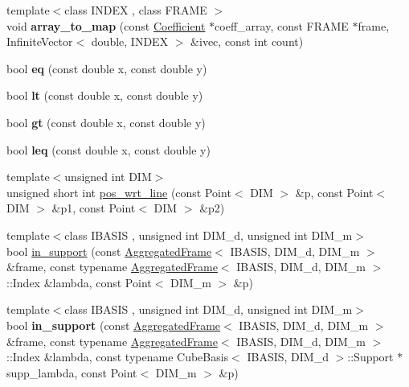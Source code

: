 \begin{CompactItemize}
\item 
\hypertarget{namespaceFrameTL_3b946e677f70c5b04b3cec8feeadc20e}{
{\footnotesize template$<$class INDEX , class FRAME $>$ }\\void \textbf{array\_\-to\_\-map} (const \hyperlink{structFrameTL_1_1Coefficient}{Coefficient} $\ast$coeff\_\-array, const FRAME $\ast$frame, InfiniteVector$<$ double, INDEX $>$ \&ivec, const int count)}
\label{namespaceFrameTL_3b946e677f70c5b04b3cec8feeadc20e}

\item 
\hypertarget{namespaceFrameTL_26ebfba3c24541d4c0b1e7591fbb6d47}{
bool \textbf{eq} (const double x, const double y)}
\label{namespaceFrameTL_26ebfba3c24541d4c0b1e7591fbb6d47}

\item 
\hypertarget{namespaceFrameTL_6bb8df9a03d57ebc0a19a9d58fddf19b}{
bool \textbf{lt} (const double x, const double y)}
\label{namespaceFrameTL_6bb8df9a03d57ebc0a19a9d58fddf19b}

\item 
\hypertarget{namespaceFrameTL_8004ad60ec83531e6c45e0e45d09d73b}{
bool \textbf{gt} (const double x, const double y)}
\label{namespaceFrameTL_8004ad60ec83531e6c45e0e45d09d73b}

\item 
\hypertarget{namespaceFrameTL_524bc935ed1e0794c223e364ce0dbc96}{
bool \textbf{leq} (const double x, const double y)}
\label{namespaceFrameTL_524bc935ed1e0794c223e364ce0dbc96}

\item 
{\footnotesize template$<$unsigned int DIM$>$ }\\unsigned short int \hyperlink{namespaceFrameTL_d4045e5ba1e89e5fbdd9084024f16ae0}{pos\_\-wrt\_\-line} (const Point$<$ DIM $>$ \&p, const Point$<$ DIM $>$ \&p1, const Point$<$ DIM $>$ \&p2)
\item 
{\footnotesize template$<$class IBASIS , unsigned int DIM\_\-d, unsigned int DIM\_\-m$>$ }\\bool \hyperlink{namespaceFrameTL_0699f5e7931ab40bf346b17e6c3bde01}{in\_\-support} (const \hyperlink{classFrameTL_1_1AggregatedFrame}{AggregatedFrame}$<$ IBASIS, DIM\_\-d, DIM\_\-m $>$ \&frame, const typename \hyperlink{classFrameTL_1_1AggregatedFrame}{AggregatedFrame}$<$ IBASIS, DIM\_\-d, DIM\_\-m $>$::Index \&lambda, const Point$<$ DIM\_\-m $>$ \&p)
\item 
\hypertarget{namespaceFrameTL_42d9dd29c91fe172a30736eb38ee21e9}{
{\footnotesize template$<$class IBASIS , unsigned int DIM\_\-d, unsigned int DIM\_\-m$>$ }\\bool \textbf{in\_\-support} (const \hyperlink{classFrameTL_1_1AggregatedFrame}{AggregatedFrame}$<$ IBASIS, DIM\_\-d, DIM\_\-m $>$ \&frame, const typename \hyperlink{classFrameTL_1_1AggregatedFrame}{AggregatedFrame}$<$ IBASIS, DIM\_\-d, DIM\_\-m $>$::Index \&lambda, const typename CubeBasis$<$ IBASIS, DIM\_\-d $>$::Support $\ast$supp\_\-lambda, const Point$<$ DIM\_\-m $>$ \&p)}
\label{namespaceFrameTL_42d9dd29c91fe172a30736eb38ee21e9}


\end{CompactItemize}
